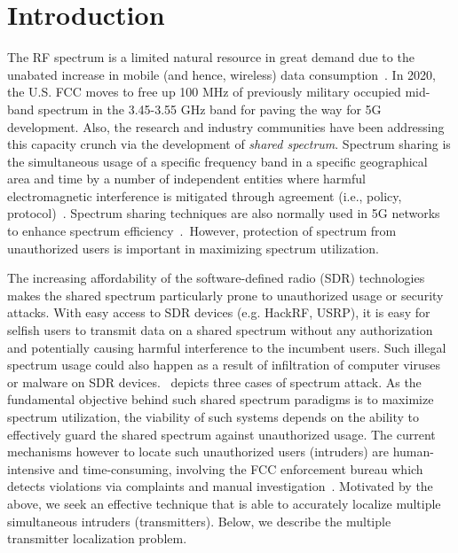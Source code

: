 \section{Introduction}
\label{sec:wowmom-intro}

The RF spectrum is a limited natural resource in great demand due to the
unabated increase in mobile (and hence, wireless) data
consumption~\cite{Jeffrey14,sigcomm21-5G}.
In 2020, the U.S. FCC moves to free up 100 MHz of previously military occupied mid-band spectrum in the 3.45-3.55 GHz band for paving the way for 5G development. 
Also, the research and industry communities have been addressing this capacity crunch via the development of {\em shared spectrum}.
Spectrum sharing is the simultaneous usage of a specific frequency band in a specific geographical area and time by a number of independent entities where harmful electromagnetic interference is mitigated through agreement (i.e., policy, protocol)~\cite{dod20-spectrum}. 
Spectrum sharing techniques are also normally used in 5G networks to enhance spectrum efficiency~\cite{survey-specshare}.~However, protection of spectrum from unauthorized
users is important in maximizing spectrum utilization.

The increasing affordability of the software-defined radio (SDR)
technologies makes the shared spectrum particularly prone to
unauthorized usage or security attacks. With easy access to SDR
devices (e.g. HackRF, USRP), it is easy for selfish users to transmit data
on a shared spectrum without any authorization and potentially causing
harmful interference to the incumbent users.  Such illegal spectrum
usage could also happen as a result of infiltration of computer viruses
or malware on SDR devices.~\cite{survey-specshare} depicts three cases of spectrum attack.
As the fundamental objective behind such
shared spectrum paradigms is to maximize spectrum utilization, the
viability of such systems depends on the ability to effectively guard
the shared spectrum against unauthorized usage.  The current
mechanisms however to locate such unauthorized users (intruders) are
human-intensive and time-consuming, involving the FCC enforcement bureau
which detects violations via complaints and manual
investigation~\cite{mobicom17-splot}. 
Motivated by the above, we seek an effective
technique that is able to accurately localize multiple simultaneous
intruders (transmitters). Below, we describe the multiple transmitter localization problem.


